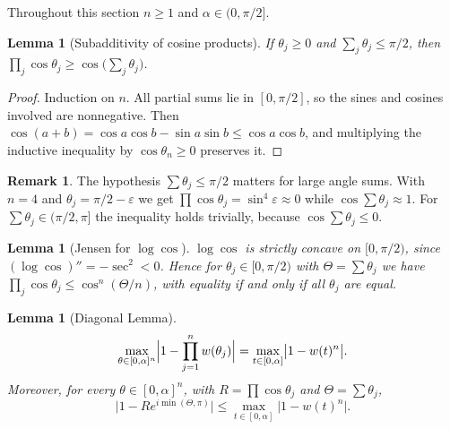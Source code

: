 \documentclass[11pt]{amsart}
\newtheorem{lemma}[theorem]{Lemma}
\theoremstyle{definition}
\newtheorem*{remark}{Remark}
\newcommand{\abs}[1]{\lvert #1\rvert}
\begin{document}
Throughout this section $n\ge1$ and $\alpha\in(0,\pi/2]$.

\begin{lemma}[Subadditivity of cosine products]\label{lem:subadd}
If $\theta_j\ge0$ and $\sum_j\theta_j\le\pi/2$, then
$\prod_j\cos\theta_j\ge\cos\bigl(\sum_j\theta_j\bigr)$.
\end{lemma}

\begin{proof}
Induction on $n$. All partial sums lie in $[0,\pi/2]$, so the sines and cosines
involved are nonnegative. Then $\cos(a+b)=\cos a\cos b-\sin a\sin b\le\cos a\cos b$,
and multiplying the inductive inequality by $\cos\theta_n\ge0$ preserves it.
\end{proof}

\begin{remark}
The hypothesis $\sum\theta_j\le\pi/2$ matters for large angle sums. With $n=4$ and
$\theta_j=\pi/2-\varepsilon$ we get $\prod\cos\theta_j=\sin^4\varepsilon\approx0$ while
$\cos\sum\theta_j\approx1$. For $\sum\theta_j\in(\pi/2,\pi]$ the inequality holds
trivially, because $\cos\sum\theta_j\le0$.
\end{remark}

\begin{lemma}[Jensen for $\log\cos$]\label{lem:jensen}
$\log\cos$ is strictly concave on $[0,\pi/2)$, since $(\log\cos)''=-\sec^2<0$. Hence
for $\theta_j\in[0,\pi/2)$ with $\Theta=\sum\theta_j$ we have
$\prod_j\cos\theta_j\le\cos^n(\Theta/n)$, with equality if and only if all
$\theta_j$ are equal.
\end{lemma}

\begin{lemma}[Diagonal Lemma]\label{lem:diagonal}
\[
\max_{\theta\in[0,\alpha]^n}\Bigl|1-\prod_{j=1}^nw(\theta_j)\Bigr|=\max_{t\in[0,\alpha]}\bigl|1-w(t)^n\bigr|.
\]
Moreover, for every $\theta\in[0,\alpha]^n$, with $R=\prod\cos\theta_j$ and
$\Theta=\sum\theta_j$,
\[
\bigl|1-Re^{i\min(\Theta,\pi)}\bigr|\le\max_{t\in[0,\alpha]}\abs{1-w(t)^n}.
\]
\end{lemma}
\end{document}
